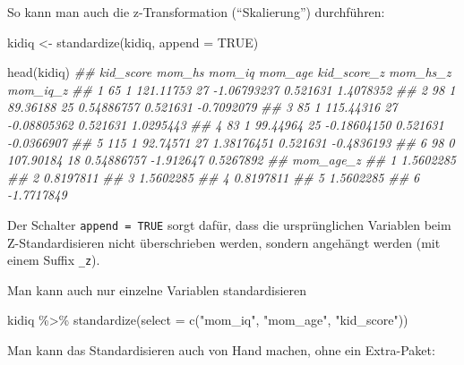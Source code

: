 \documentclass[
  a4paper,
  DIV=11]{scrreprt}
\newenvironment{Shaded}{\begin{snugshade}}{\end{snugshade}}
\newcommand{\AttributeTok}[1]{\textcolor[rgb]{0.40,0.45,0.13}{#1}}
\newcommand{\ConstantTok}[1]{\textcolor[rgb]{0.56,0.35,0.01}{#1}}
\newcommand{\DocumentationTok}[1]{\textcolor[rgb]{0.37,0.37,0.37}{\textit{#1}}}
\newcommand{\FunctionTok}[1]{\textcolor[rgb]{0.28,0.35,0.67}{#1}}
\newcommand{\NormalTok}[1]{\textcolor[rgb]{0.00,0.23,0.31}{#1}}
\newcommand{\OtherTok}[1]{\textcolor[rgb]{0.00,0.23,0.31}{#1}}
\newcommand{\SpecialCharTok}[1]{\textcolor[rgb]{0.37,0.37,0.37}{#1}}
\newcommand{\StringTok}[1]{\textcolor[rgb]{0.13,0.47,0.30}{#1}}
\theoremstyle{definition}
\theoremstyle{remark}
\begin{document}
So kann man auch die z-Transformation (``Skalierung'') durchführen:

\begin{Shaded}
\begin{Highlighting}[]
\NormalTok{kidiq }\OtherTok{\textless{}{-}} 
  \FunctionTok{standardize}\NormalTok{(kidiq, }\AttributeTok{append =} \ConstantTok{TRUE}\NormalTok{)}

\FunctionTok{head}\NormalTok{(kidiq)}
\DocumentationTok{\#\#   kid\_score mom\_hs    mom\_iq mom\_age kid\_score\_z  mom\_hs\_z   mom\_iq\_z}
\DocumentationTok{\#\# 1        65      1 121.11753      27 {-}1.06793237  0.521631  1.4078352}
\DocumentationTok{\#\# 2        98      1  89.36188      25  0.54886757  0.521631 {-}0.7092079}
\DocumentationTok{\#\# 3        85      1 115.44316      27 {-}0.08805362  0.521631  1.0295443}
\DocumentationTok{\#\# 4        83      1  99.44964      25 {-}0.18604150  0.521631 {-}0.0366907}
\DocumentationTok{\#\# 5       115      1  92.74571      27  1.38176451  0.521631 {-}0.4836193}
\DocumentationTok{\#\# 6        98      0 107.90184      18  0.54886757 {-}1.912647  0.5267892}
\DocumentationTok{\#\#    mom\_age\_z}
\DocumentationTok{\#\# 1  1.5602285}
\DocumentationTok{\#\# 2  0.8197811}
\DocumentationTok{\#\# 3  1.5602285}
\DocumentationTok{\#\# 4  0.8197811}
\DocumentationTok{\#\# 5  1.5602285}
\DocumentationTok{\#\# 6 {-}1.7717849}
\end{Highlighting}
\end{Shaded}

Der Schalter \texttt{append\ =\ TRUE} sorgt dafür, dass die
ursprünglichen Variablen beim Z-Standardisieren nicht überschrieben
werden, sondern angehängt werden (mit einem Suffix \texttt{\_z}).

Man kann auch nur einzelne Variablen standardisieren

\begin{Shaded}
\begin{Highlighting}[]
\NormalTok{kidiq }\SpecialCharTok{\%\textgreater{}\%} 
  \FunctionTok{standardize}\NormalTok{(}\AttributeTok{select =} \FunctionTok{c}\NormalTok{(}\StringTok{"mom\_iq"}\NormalTok{, }\StringTok{"mom\_age"}\NormalTok{, }\StringTok{"kid\_score"}\NormalTok{))}
\end{Highlighting}
\end{Shaded}

Man kann das Standardisieren auch von Hand machen, ohne ein Extra-Paket:
\end{document}
